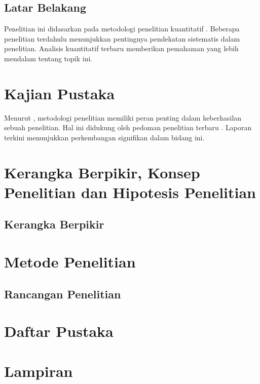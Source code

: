 \documentclass[12pt, a4paper]{book}
\begin{document}
\section{Latar Belakang}
Penelitian ini didasarkan pada metodologi penelitian kuantitatif \parencite{smith2020}. 
Beberapa penelitian terdahulu \textcite{jones2019} menunjukkan pentingnya pendekatan sistematis 
dalam penelitian. Analisis kuantitatif terbaru \parencite{lee2021} memberikan 
pemahaman yang lebih mendalam tentang topik ini.

\chapter{Kajian Pustaka}
Menurut \textcite{anderson2018}, metodologi penelitian memiliki peran penting dalam 
keberhasilan sebuah penelitian. Hal ini didukung oleh pedoman penelitian terbaru 
\parencite{research2022}. Laporan terkini \parencite{university2021} menunjukkan 
perkembangan signifikan dalam bidang ini.

\chapter{Kerangka Berpikir, Konsep Penelitian dan Hipotesis Penelitian}
\section{Kerangka Berpikir}

\chapter{Metode Penelitian}
\section{Rancangan Penelitian}

\backmatter

\chapter*{Daftar Pustaka}
\printbibliography[title={Daftar Pustaka}]

\chapter*{Lampiran}
\end{document}
